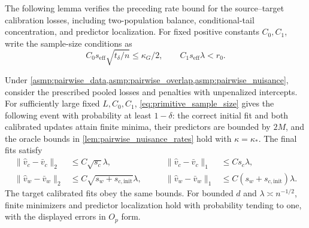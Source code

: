 \documentclass[12pt]{article}
\begin{document}
The following lemma verifies the preceding rate bound for the source--target calibration losses, including two-population balance, conditional-tail concentration, and predictor localization. For fixed positive constants $C_0,C_1$, write the sample-size conditions as
\begin{equation}\label{eq:primitive_sample_size}
C_0s_{\mathrm{eff}}\sqrt{t_\delta/n}\le\kappa_G/2,
\qquad C_1s_{\mathrm{eff}}\lambda<r_0.
\end{equation}
\begin{lemma}\label{lem:calibration_rates}
Under \cref{asmp:pairwise_data,asmp:pairwise_overlap,asmp:pairwise_nuisance}, consider the prescribed pooled losses and penalties with unpenalized intercepts. For sufficiently large fixed $L,C_0,C_1$, \cref{eq:primitive_sample_size} gives the following event with probability at least $1-\delta$: the correct initial fit and both calibrated updates attain finite minima, their predictors are bounded by $2M$, and the oracle bounds in \cref{lem:pairwise_nuisance_rates} hold with $\kappa=\kappa_*$. The final fits satisfy
\[
\begin{alignedat}{2}
\|\widehat v_c-\bar v_c\|_2&\le C\sqrt{s_c}\lambda,
&\qquad \|\widehat v_c-\bar v_c\|_1&\le Cs_c\lambda,\\
\|\widehat v_w-\bar v_w\|_2&\le C\sqrt{s_w+s_{c,\mathrm{init}}}\lambda,
&\qquad \|\widehat v_w-\bar v_w\|_1&\le C(s_w+s_{c,\mathrm{init}})\lambda.
\end{alignedat}
\]
The target calibrated fits obey the same bounds. For bounded $d$ and $\lambda\asymp n^{-1/2}$, finite minimizers and predictor localization hold with probability tending to one, with the displayed errors in $O_p$ form.
\end{lemma}
\end{document}
